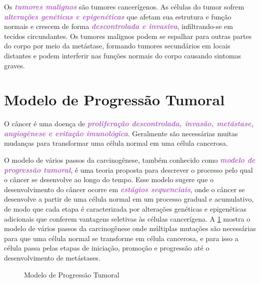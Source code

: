 \documentclass[11pt,a4paper]{article}
\begin{document}
    Os \textcolor{MediumOrchid}{\textbf{\textit{tumores malignos}}} são tumores cancerígenos. As células do tumor sofrem \textcolor{MediumOrchid}{\textbf{\textit{alterações genéticas e epigenéticas}}} que afetam sua estrutura e função normais e crescem de forma \textcolor{MediumOrchid}{\textbf{\textit{descontrolada e invasiva}}}, infiltrando-se em tecidos circundantes. Os tumores malignos podem se espalhar para outras partes do corpo por meio da metástase, formando tumores secundários em locais distantes e podem interferir nas funções normais do corpo causando sintomas graves. 

\section{Modelo de Progressão Tumoral}

    O câncer é uma doença de \textcolor{MediumOrchid}{\textbf{\textit{proliferação descontrolada, invasão, metástase, angiogênese e evitação imunológica}}}. Geralmente são necessárias muitas mudanças para transformar uma célula normal em uma célula cancerosa. 

    O modelo de vários passos da carcinogênese, também conhecido como \textcolor{MediumOrchid}{\textbf{\textit{modelo de progressão tumoral}}}, é uma teoria proposta para descrever o processo pelo qual o câncer se desenvolve ao longo do tempo. Esse modelo sugere que o desenvolvimento do câncer ocorre em \textcolor{MediumOrchid}{\textbf{\textit{estágios sequenciais}}}, onde o câncer se desenvolve a partir de uma célula normal em um processo gradual e acumulativo, de modo que cada etapa é caracterizada por alterações genéticas e epigenéticas adicionais que conferem vantagens seletivas às células cancerígena. A \ref{fig:carcinogeneseMultiPassos} mostra o modelo de vários passos da carcinogênese onde múltiplas mutações são necessárias para que uma célula normal se transforme em célula cancerosa, e para isso a célula passa pelas etapas de iniciação, promoção e progressão até o desenvolvimento de metástases.  

    \begin{figure}[h]
        \centering
        \caption{Modelo de Progressão Tumoral}
        \label{fig:carcinogeneseMultiPassos}
    \end{figure}
\end{document}
